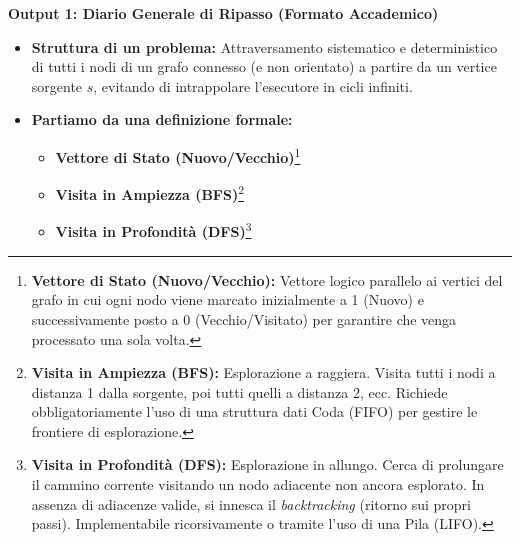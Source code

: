 \documentclass[a4paper, 11pt]{report}
\newcommand{\definizione}[2]{%
\textbf{#1}\footnote{\textbf{#1:} #2}%
}
\begin{document}
\vspace{0.5cm}
\textbf{Output 1: Diario Generale di Ripasso (Formato Accademico)}

\begin{itemize}
\item \textbf{Struttura di un problema:}
Attraversamento sistematico e deterministico di tutti i nodi di un grafo connesso (e non orientato) a partire da un vertice sorgente $s$, evitando di intrappolare l'esecutore in cicli infiniti.

\item \textbf{Partiamo da una definizione formale:}
\begin{itemize}
    \item \definizione{Vettore di Stato (Nuovo/Vecchio)}{Vettore logico parallelo ai vertici del grafo in cui ogni nodo viene marcato inizialmente a 1 (Nuovo) e successivamente posto a 0 (Vecchio/Visitato) per garantire che venga processato una sola volta.}
    \item \definizione{Visita in Ampiezza (BFS)}{Esplorazione a raggiera. Visita tutti i nodi a distanza 1 dalla sorgente, poi tutti quelli a distanza 2, ecc. Richiede obbligatoriamente l'uso di una struttura dati Coda (FIFO) per gestire le frontiere di esplorazione.}
    \item \definizione{Visita in Profondità (DFS)}{Esplorazione in allungo. Cerca di prolungare il cammino corrente visitando un nodo adiacente non ancora esplorato. In assenza di adiacenze valide, si innesca il \textit{backtracking} (ritorno sui propri passi). Implementabile ricorsivamente o tramite l'uso di una Pila (LIFO).}
\end{itemize}


\end{itemize}
\end{document}
